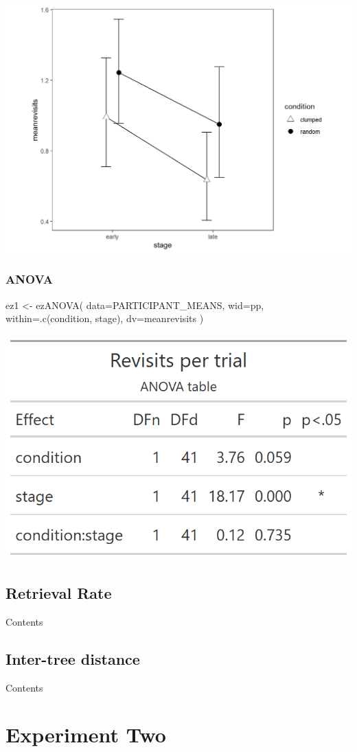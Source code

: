 \documentclass[
]{book}
\newenvironment{Shaded}{\begin{snugshade}}{\end{snugshade}}
\newcommand{\AttributeTok}[1]{\textcolor[rgb]{0.77,0.63,0.00}{#1}}
\newcommand{\FunctionTok}[1]{\textcolor[rgb]{0.00,0.00,0.00}{#1}}
\newcommand{\NormalTok}[1]{#1}
\newcommand{\OtherTok}[1]{\textcolor[rgb]{0.56,0.35,0.01}{#1}}
\begin{document}
\includegraphics[width=0.5\linewidth]{e1_figures/stage-revisits-1}

\hypertarget{anova}{%
\section{ANOVA}\label{anova}}

\begin{Shaded}
\begin{Highlighting}[]
\NormalTok{ez1 }\OtherTok{\textless{}{-}} \FunctionTok{ezANOVA}\NormalTok{(}
  \AttributeTok{data=}\NormalTok{PARTICIPANT\_MEANS,}
  \AttributeTok{wid=}\NormalTok{pp,}
  \AttributeTok{within=}\FunctionTok{.c}\NormalTok{(condition, stage),}
  \AttributeTok{dv=}\NormalTok{meanrevisits}
\NormalTok{)}
\end{Highlighting}
\end{Shaded}

\includegraphics[width=0.33\linewidth]{e1_figures/anova-table-revisits-1}

\hypertarget{retrieval-rate}{%
\chapter{Retrieval Rate}\label{retrieval-rate}}

Contents

\hypertarget{inter-tree-distance}{%
\chapter{Inter-tree distance}\label{inter-tree-distance}}

Contents

\hypertarget{part-experiment-two}{%
\part{Experiment Two}\label{part-experiment-two}}
\end{document}
